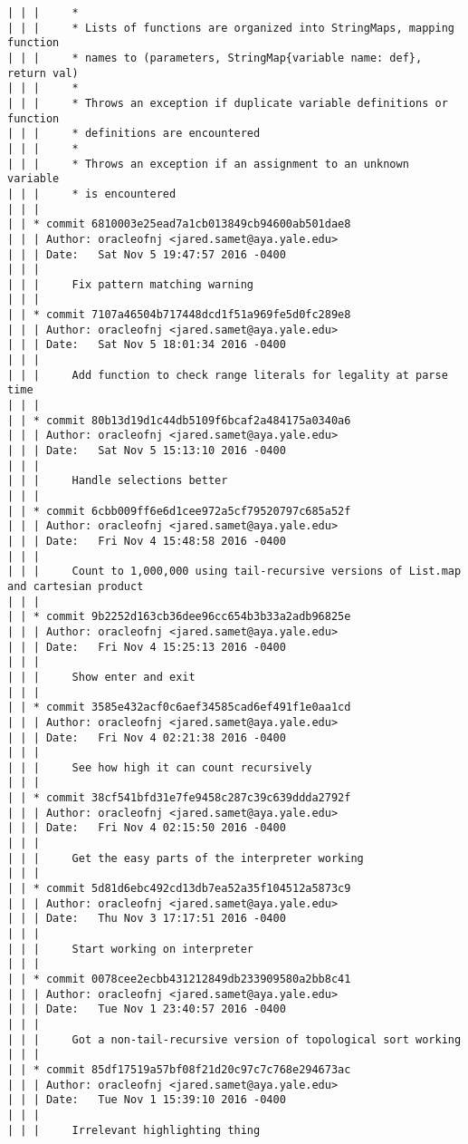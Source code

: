 \begin{lstlisting}
| | |     *
| | |     * Lists of functions are organized into StringMaps, mapping function
| | |     * names to (parameters, StringMap{variable name: def}, return val)
| | |     *
| | |     * Throws an exception if duplicate variable definitions or function
| | |     * definitions are encountered
| | |     *
| | |     * Throws an exception if an assignment to an unknown variable
| | |     * is encountered
| | |    
| | * commit 6810003e25ead7a1cb013849cb94600ab501dae8
| | | Author: oracleofnj <jared.samet@aya.yale.edu>
| | | Date:   Sat Nov 5 19:47:57 2016 -0400
| | | 
| | |     Fix pattern matching warning
| | |    
| | * commit 7107a46504b717448dcd1f51a969fe5d0fc289e8
| | | Author: oracleofnj <jared.samet@aya.yale.edu>
| | | Date:   Sat Nov 5 18:01:34 2016 -0400
| | | 
| | |     Add function to check range literals for legality at parse time
| | |    
| | * commit 80b13d19d1c44db5109f6bcaf2a484175a0340a6
| | | Author: oracleofnj <jared.samet@aya.yale.edu>
| | | Date:   Sat Nov 5 15:13:10 2016 -0400
| | | 
| | |     Handle selections better
| | |    
| | * commit 6cbb009ff6e6d1cee972a5cf79520797c685a52f
| | | Author: oracleofnj <jared.samet@aya.yale.edu>
| | | Date:   Fri Nov 4 15:48:58 2016 -0400
| | | 
| | |     Count to 1,000,000 using tail-recursive versions of List.map and cartesian product
| | |    
| | * commit 9b2252d163cb36dee96cc654b3b33a2adb96825e
| | | Author: oracleofnj <jared.samet@aya.yale.edu>
| | | Date:   Fri Nov 4 15:25:13 2016 -0400
| | | 
| | |     Show enter and exit
| | |    
| | * commit 3585e432acf0c6aef34585cad6ef491f1e0aa1cd
| | | Author: oracleofnj <jared.samet@aya.yale.edu>
| | | Date:   Fri Nov 4 02:21:38 2016 -0400
| | | 
| | |     See how high it can count recursively
| | |    
| | * commit 38cf541bfd31e7fe9458c287c39c639ddda2792f
| | | Author: oracleofnj <jared.samet@aya.yale.edu>
| | | Date:   Fri Nov 4 02:15:50 2016 -0400
| | | 
| | |     Get the easy parts of the interpreter working
| | |    
| | * commit 5d81d6ebc492cd13db7ea52a35f104512a5873c9
| | | Author: oracleofnj <jared.samet@aya.yale.edu>
| | | Date:   Thu Nov 3 17:17:51 2016 -0400
| | | 
| | |     Start working on interpreter
| | |    
| | * commit 0078cee2ecbb431212849db233909580a2bb8c41
| | | Author: oracleofnj <jared.samet@aya.yale.edu>
| | | Date:   Tue Nov 1 23:40:57 2016 -0400
| | | 
| | |     Got a non-tail-recursive version of topological sort working
| | |    
| | * commit 85df17519a57bf08f21d20c97c7c768e294673ac
| | | Author: oracleofnj <jared.samet@aya.yale.edu>
| | | Date:   Tue Nov 1 15:39:10 2016 -0400
| | | 
| | |     Irrelevant highlighting thing

\end{lstlisting}
